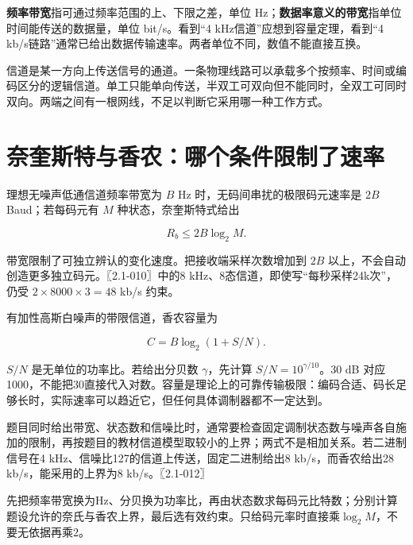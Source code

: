 \textbf{频率带宽}指可通过频率范围的上、下限之差，单位 Hz；\textbf{数据率意义的带宽}指单位时间能传送的数据量，单位 bit/s。看到``4 kHz信道''应想到容量定理，看到``4 kb/s链路''通常已给出数据传输速率。两者单位不同，数值不能直接互换。

信道是某一方向上传送信号的通道。一条物理线路可以承载多个按频率、时间或编码区分的逻辑信道。单工只能单向传送，半双工可双向但不能同时，全双工可同时双向。两端之间有一根网线，不足以判断它采用哪一种工作方式。

\section{奈奎斯特与香农：哪个条件限制了速率}\label{CN02-02}

理想无噪声低通信道频率带宽为 \(B\) Hz 时，无码间串扰的极限码元速率是 \(2B\) Baud；若每码元有 \(M\) 种状态，奈奎斯特式给出

\[R_b\le 2B\log_2M.\]

带宽限制了可独立辨认的变化速度。把接收端采样次数增加到 \(2B\) 以上，不会自动创造更多独立码元。〖2.1-010〗中的8 kHz、8态信道，即使写``每秒采样24k次''，仍受 \(2\times8000\times3=48\) kb/s 约束。

有加性高斯白噪声的带限信道，香农容量为

\[C=B\log_2(1+S/N).\]

\(S/N\) 是无单位的功率比。若给出分贝数 \(\gamma\)，先计算 \(S/N=10^{\gamma/10}\)。30 dB 对应1000，不能把30直接代入对数。容量是理论上的可靠传输极限：编码合适、码长足够长时，实际速率可以趋近它，但任何具体调制器都不一定达到。

题目同时给出带宽、状态数和信噪比时，通常要检查固定调制状态数与噪声各自施加的限制，再按题目的教材信道模型取较小的上界；两式不是相加关系。若二进制信号在4 kHz、信噪比127的信道上传送，固定二进制给出8 kb/s，而香农给出28 kb/s，能采用的上界为8 kb/s。〖2.1-012〗

\begin{methodbox}[容量题的四步换算]

先把频率带宽换为Hz、分贝换为功率比，再由状态数求每码元比特数；分别计算题设允许的奈氏与香农上界，最后选有效约束。只给码元率时直接乘\(\log_2M\)，不要无依据再乘2。

\end{methodbox}

